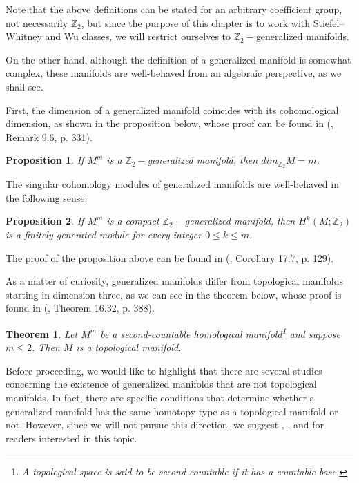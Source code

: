 \documentclass[12pt,oneside]{book}
\newtheorem{teo}    {Theorem}[chapter]
\newtheorem{prop}   {Proposition}[chapter]
\newcommand{\Z}{\mathbb{Z}}
\begin{document}
    Note that the above definitions can be stated for an arbitrary coefficient group, not necessarily $\Z_{2}$, but since the purpose of this 
    chapter is to work with Stiefel–Whitney and Wu classes, we will restrict ourselves to $\Z_{2}-$generalized manifolds.

    On the other hand, although the definition of a generalized manifold is somewhat complex, these manifolds are well-behaved from an 
    algebraic perspective, as we shall see.

    First, the dimension of a generalized manifold coincides with its cohomological dimension, as shown in the proposition below, whose proof 
    can be found in (\cite{bredon_2}, Remark 9.6, p. 331).

    \begin{prop}
        If $M^{m}$ is a $\Z_{2}-$generalized manifold, then $dim_{\Z_{2}}M=m$.
    \end{prop}

    The singular cohomology modules of generalized manifolds are well-behaved in the following sense:

    \begin{prop}
        If $M^{m}$ is a compact $\Z_{2}-$generalized manifold, then $H^{k}(M;\Z_{2})$ is a finitely generated module for every integer 
        $0\leq k\leq m$.
    \end{prop}

    The proof of the proposition above can be found in (\cite{bredon_2}, Corollary 17.7, p. 129).

    As a matter of curiosity, generalized manifolds differ from topological manifolds starting in dimension three, as we can see in the 
    theorem below, whose proof is found in (\cite{bredon_2}, Theorem 16.32, p. 388).

    \begin{teo}
        Let $M^{m}$ be a second-countable homological manifold\footnote{A topological space is said to be second-countable if it has a countable 
        base.} and suppose $m\leq 2$. Then $M$ is a topological manifold.
    \end{teo}

    Before proceeding, we would like to highlight that there are several studies concerning the existence of generalized manifolds that are 
    not topological manifolds. In fact, there are specific conditions that determine whether a generalized manifold has the same homotopy type 
    as a topological manifold or not. However, since we will not pursue this direction, we suggest \cite{mio_1}, \cite{mio_2}, and 
    \cite{gm-book} for readers interested in this topic.
\end{document}

